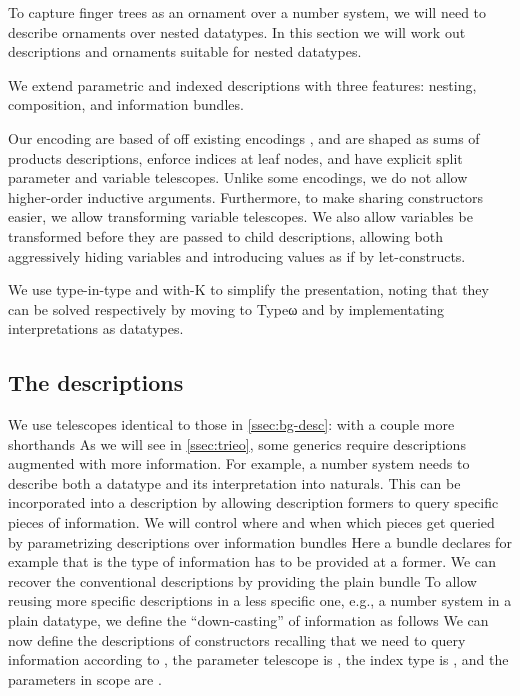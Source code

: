 To capture finger trees as an ornament over a number system, we will need to describe ornaments over nested datatypes. In this section we will work out descriptions and ornaments suitable for nested datatypes.

We extend parametric and indexed descriptions with three features: nesting, composition, and information bundles.

Our encoding are based of off existing encodings \cite{sijsling,practgen}, and are shaped as sums of products descriptions, enforce indices at leaf nodes, and have explicit split parameter and variable telescopes. Unlike some encodings, we do not allow higher-order inductive arguments. Furthermore, to make sharing constructors easier, we allow transforming variable telescopes. We also allow variables be transformed before they are passed to child descriptions, allowing both aggressively hiding variables and introducing values as if by let-constructs.

We use type-in-type and with-K to simplify the presentation, noting that they can be solved respectively by moving to Typeω and by implementating interpretations as datatypes.

\subsection{The descriptions}
We use telescopes identical to those in \autoref{ssec:bg-desc}:
with a couple more shorthands
As we will see in \autoref{ssec:trieo}, some generics require descriptions augmented with more information. For example, a number system needs to describe both a datatype and its interpretation into naturals. This can be incorporated into a description by allowing description formers to query specific pieces of information. We will control where and when which pieces get queried by parametrizing descriptions over information bundles  
Here a bundle declares for example that  is the type of information has to be provided at a  former. We can recover the conventional descriptions by providing the plain bundle
To allow reusing more specific descriptions in a less specific one, e.g., a number system in a plain datatype, we define the ``down-casting'' of information as follows
We can now define the descriptions of constructors
recalling that we need to query information according to , the parameter telescope is , the index type is , and the parameters in scope are .

